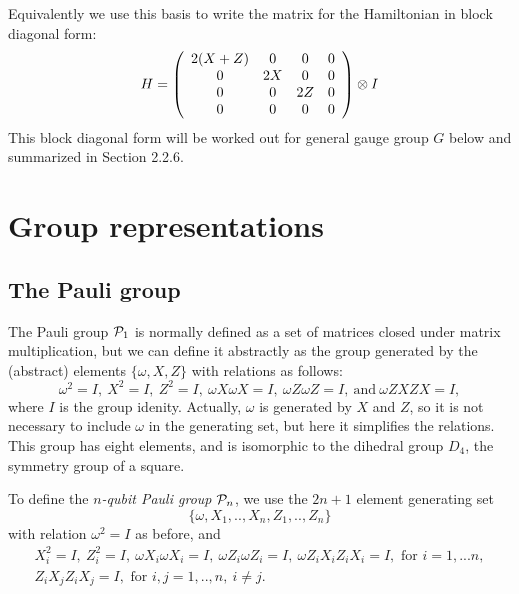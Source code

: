 Equivalently we use this basis to 
write the matrix for the Hamiltonian in
block diagonal form:
$$
H = 
\left( \begin{array}{cccc}
2(X+Z) & 0 & 0 & 0 \\
0  & 2X & 0 & 0 \\
0  & 0 & 2Z & 0 \\
0  & 0 & 0 & 0 \\
\end{array} \right) \otimes I
$$
This block diagonal form will be worked out for
general gauge group $G$ below and summarized in Section 2.2.6.


\section{Group representations}\label{GroupReps}

\subsection{The Pauli group}

The Pauli group $\mathcal{P}_1$ is normally 
defined as a set of matrices closed under
matrix multiplication, but we can define
it abstractly
as the group generated
by the (abstract) elements $\{\omega, X, Z\}$ with
relations as follows:
$$
\omega^2=I,\ X^2=I,\ Z^2=I,\ \omega X\omega X=I,\ \omega Z\omega Z=I,\ \mbox{and}\  \omega ZXZX=I,
$$
where $I$ is the group idenity.
Actually, $\omega $ is generated by $X$ and $Z$, so
it is not necessary to include $\omega $ in the generating set,
but here it simplifies the relations.
This group has eight elements, and is isomorphic to the dihedral group $D_4$,
the symmetry group of a square.

To define
the {\it $n$-qubit Pauli group} $\mathcal{P}_n$, 
we use the $2n+1$ element 
generating set 
$$\{\omega , X_1, .., X_n, Z_1, .., Z_n\}$$
with relation $\omega^2=I$ as before, and
\begin{equation}\label{presentation}
\begin{array}{c}
X_i^2=I,\ Z_i^2=I,\ \omega X_i\omega X_i=I,\ \omega Z_i\omega Z_i=I,\ \omega Z_iX_iZ_iX_i=I, 
\mbox{\ for\ } i=1,...n,\\
Z_iX_jZ_iX_j=I, \mbox{\ for\ } i, j = 1,..,n,\ i\ne j.
\end{array}
\end{equation}

